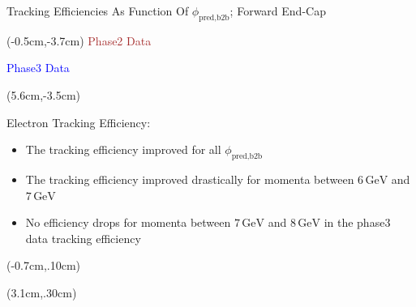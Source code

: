 \documentclass[8pt]{beamer}
\begin{document}
\begin{frame}{Tracking Efficiencies As Function Of $\phi_{\textrm{pred,b2b}}$; Forward End-Cap}
	\begin{textblock*}{4cm}(-0.5cm,-3.7cm)
		\textcolor{brown}{Phase2 Data}
		
		\textcolor{blue}{Phase3 Data}
	\end{textblock*}
	
	
	\begin{textblock*}{6cm}(5.6cm,-3.5cm)
		\begin{mybox}
			Electron Tracking Efficiency:
			\begin{itemize}
				\item The tracking efficiency improved for all $\phi_{\textrm{pred,b2b}}$
				
				\item<2-> The tracking efficiency improved drastically for momenta between $6\,\textrm{GeV}$ and $7\,\textrm{GeV}$
				\item<3-> No efficiency drops for momenta between $7\,\textrm{GeV}$ and $8\,\textrm{GeV}$ in the phase3 data tracking efficiency
			\end{itemize}
		\end{mybox}
	\end{textblock*}
	
		

	
	
	
	
		\begin{textblock*}{5cm}(-0.7cm,.10cm)
	\end{textblock*}
	
	
	
	
		
	\begin{textblock*}{5cm}(3.1cm,.30cm)
	\end{textblock*}
	
	
	
	

	\pause[4]
	
\end{frame}
\end{document}
